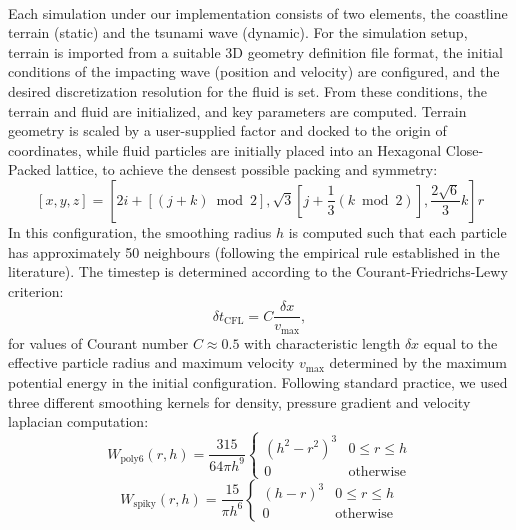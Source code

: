 \documentclass{llncs}
\begin{document}
\paragraph{} Each simulation under our implementation consists of two elements, the
coastline terrain (static) and the tsunami wave (dynamic). For the simulation setup,
terrain is imported from a suitable 3D geometry definition file format, the initial
conditions of the impacting wave (position and velocity) are configured, and the desired
discretization resolution for the fluid is set. From these conditions, the terrain and
fluid are initialized, and key parameters are computed. Terrain geometry is scaled by a
user-supplied factor and docked to the origin of coordinates, while fluid particles are
initially placed into an Hexagonal Close-Packed lattice, to achieve the densest possible
packing and symmetry:
\begin{equation}
  \label{eq:hcp}
  [x, y, z] = \left[ 2i+[(j+k) \bmod 2], \sqrt{3}[j + \frac{1}{3} (k \bmod 2)],
    \frac{2\sqrt{6}}{3} k \right] r
\end{equation}
In this configuration, the smoothing radius $h$ is computed such that each particle has
approximately 50 neighbours (following the empirical rule established in the
literature). The timestep is determined according to the Courant-Friedrichs-Lewy
criterion:
\begin{equation}
  \label{eq:cfl}
  \delta t_{\text{CFL}} = C \frac {\delta x}{v_{\text{max}}},
\end{equation}
for values of Courant number $C\approx0.5$ with characteristic length $\delta x$ equal to
the effective particle radius and maximum velocity $v_{\text{max}}$ determined by the
maximum potential energy in the initial configuration. Following standard practice, we
used three different smoothing kernels for density, pressure gradient and velocity
laplacian computation:
\begin{equation}
  \label{eq:poly6}
  W_{\text{poly6}}(r, h) = \frac{315}{64 \pi h^9}
  \begin{cases}
    (h^2 - r^2)^3 & 0 \leq r \leq h\\
    0 & \text{otherwise}
  \end{cases}
\end{equation}
\begin{equation}
  \label{eq:spiky}
  W_{\text{spiky}}(r, h) = \frac{15}{\pi h^6}
  \begin{cases}
    (h - r)^3 & 0 \leq r \leq h\\
    0 & \text{otherwise}
  \end{cases}
\end{equation}
\end{document}
